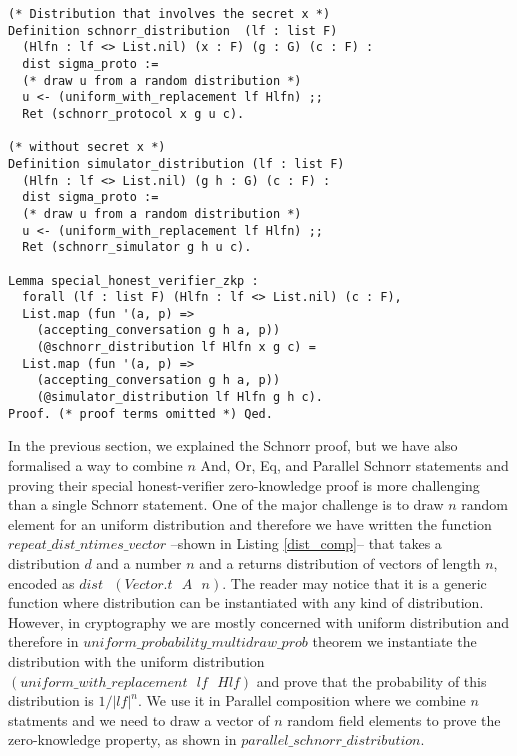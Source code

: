 \documentclass[conference,compsoc]{IEEEtran}
\begin{document}
\begin{lstlisting}[frame=single, language=Coq, caption={Special Honest-Verifier Zero-Knowledge Proof},
  label={def_zero},captionpos=t, basicstyle=\ttfamily\footnotesize,
  abovecaptionskip=-\medskipamount]
(* Distribution that involves the secret x *)
Definition schnorr_distribution  (lf : list F) 
  (Hlfn : lf <> List.nil) (x : F) (g : G) (c : F) : 
  dist sigma_proto :=
  (* draw u from a random distribution *)
  u <- (uniform_with_replacement lf Hlfn) ;;
  Ret (schnorr_protocol x g u c).

(* without secret x *)
Definition simulator_distribution (lf : list F) 
  (Hlfn : lf <> List.nil) (g h : G) (c : F) : 
  dist sigma_proto :=
  (* draw u from a random distribution *)
  u <- (uniform_with_replacement lf Hlfn) ;;
  Ret (schnorr_simulator g h u c).
  
Lemma special_honest_verifier_zkp : 
  forall (lf : list F) (Hlfn : lf <> List.nil) (c : F), 
  List.map (fun '(a, p) => 
    (accepting_conversation g h a, p))
    (@schnorr_distribution lf Hlfn x g c) = 
  List.map (fun '(a, p) => 
    (accepting_conversation g h a, p))
    (@simulator_distribution lf Hlfn g h c).
Proof. (* proof terms omitted *) Qed. 
\end{lstlisting}

In the previous section, we explained the Schnorr proof, 
but we have also formalised a way to combine $n$ And, Or, Eq, 
and Parallel Schnorr statements and proving their special 
honest-verifier zero-knowledge proof is more challenging 
than a single Schnorr statement. One of the major challenge 
is to draw $n$ random element for an uniform distribution 
and therefore we have written the function $repeat\_dist\_ntimes\_vector$ --shown in Listing \ref{dist_comp}--
that takes a distribution $d$ and a number $n$ and a returns 
distribution of vectors of length $n$,  encoded as 
$dist \text{ } (Vector.t \text{ } A \text{ } n)$. The 
reader may notice that it is a generic function 
where distribution can be instantiated with 
any kind of distribution. However, in cryptography 
we are mostly concerned with uniform distribution and  
therefore in $uniform\_probability\_multidraw\_prob$ theorem
we instantiate the distribution with 
the uniform distribution $(uniform\_with\_replacement\text{ }lf\text{ }Hlf)$ and 
prove that the probability of this distribution 
is $1/|lf|^n$. We use it in Parallel composition where we combine $n$ statments and  
we need to draw a vector of $n$ random field elements to 
prove the zero-knowledge property, as shown in $parallel\_schnorr\_distribution$.
  
\end{document}
